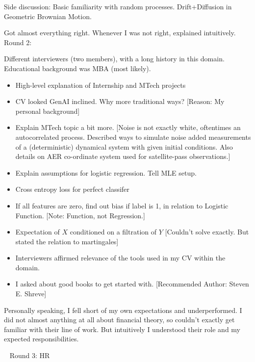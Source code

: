 \documentclass[12pt]{article}
\begin{document}
Side discussion: Basic familiarity with random processes. Drift+Diffusion in Geometric Brownian Motion.

Got almost everything right. Whenever I was not right, explained intuitively.
\vspace{15pt}\
\newline
Round 2:

Different interviewers (two members), with a long history in this domain. Educational background was MBA (most likely).

\begin{itemize}
    \item High-level explanation of Internship and MTech projects
    \item CV looked GenAI inclined. Why more traditional ways? [Reason: My personal background]
    \item Explain MTech topic a bit more. [Noise is not exactly white, oftentimes an autocorrelated process. Described ways to simulate noise added measurements of a (deterministic) dynamical system with given initial conditions. Also details on AER co-ordinate system used for satellite-pass observations.]
    \item Explain assumptions for logistic regression. Tell MLE setup.
    \item Cross entropy loss for perfect classifer
    \item If all features are zero, find out bias if label is 1, in relation to Logistic Function. [Note: Function, not Regression.]
    \item Expectation of $X$ conditioned on a filtration of $Y$ [Couldn't solve exactly. But stated the relation to martingales]
    \item Interviewers affirmed relevance of the tools used in my CV within the domain.
    \item I asked about good books to get started with. [Recommended Author: Steven E. Shreve]
\end{itemize}

Personally speaking, I fell short of my own expectations and underperformed. I did not almost anything at all about financial theory, so couldn't exactly get familiar with their line of work. But intuitively I understood their role and my expected responsibilities. 


\vspace{15pt}\
\newline
Round 3: HR
\end{document}
